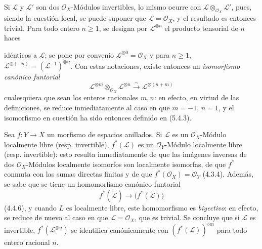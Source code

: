 \begin{env}[5.4.4]
\label{0.5.4.4-fr}
Si $\mathcal{L}$ y $\mathcal{L}'$ son dos $\mathcal{O}_X$-Módulos
invertibles, lo mismo ocurre con
$\mathcal{L}\otimes_{\mathcal{O}_X}\mathcal{L}'$, pues, siendo la cuestión
local, se puede suponer que $\mathcal{L}=\mathcal{O}_X$, y el resultado es
entonces trivial. Para todo entero $n\geq1$, se designa por
$\mathcal{L}^{\otimes n}$ el producto tensorial de $n$ haces


idénticos a $\mathcal{L}$; se pone por convenio
$\mathcal{L}^{\otimes0}=\mathcal{O}_X$ y para $n\geq1$,
$\mathcal{L}^{\otimes(-n)}=(\mathcal{L}^{-1})^{\otimes n}$. Con estas
notaciones, existe entonces un \emph{isomorfismo canónico funtorial}
\[
  \mathcal{L}^{\otimes m}\otimes_{\mathcal{O}_X}\mathcal{L}^{\otimes n}
  \xrightarrow{\sim}
  \mathcal{L}^{\otimes(n+m)}
  \tag{5.4.4.1}\label{0.5.4.4.1-fr}
\]
cualesquiera que sean los enteros racionales $m,n$: en efecto, en virtud de las
definiciones, se reduce inmediatamente al caso en que $m=-1$, $n=1$, y
el isomorfismo en cuestión ha sido entonces definido en (5.4.3).
\end{env}

\begin{env}[5.4.5]
Sea $f:Y\to X$ un morfismo de espacios anillados. Si $\mathcal{L}$ es un
$\mathcal{O}_X$-Módulo localmente libre (resp. invertible),
$f^*(\mathcal{L})$ es un $\mathcal{O}_Y$-Módulo localmente libre (resp.
invertible): esto resulta inmediatamente de que las imágenes inversas de dos
$\mathcal{O}_X$-Módulos localmente isomorfos son localmente isomorfas, de
que $f^*$ conmuta con las sumas directas finitas y de que
$f^*(\mathcal{O}_X)=\mathcal{O}_Y$ (4.3.4). Además, se sabe que se tiene un
homomorfismo canónico funtorial
\[
  f^*(\check{\mathcal{L}})
  \longrightarrow
  \bigl(f^*(\mathcal{L})\bigr)\check{}
\]
(4.4.6), y cuando $L$ es localmente libre, este homomorfismo es
\emph{biyectivo}: en efecto, se reduce de nuevo al caso en que
$\mathcal{L}=\mathcal{O}_X$, que es trivial. Se concluye que si
$\mathcal{L}$ es invertible, $f^*(\mathcal{L}^{\otimes n})$ se identifica
canónicamente con $(f^*(\mathcal{L}))^{\otimes n}$ para todo entero racional
$n$.
\end{env}

